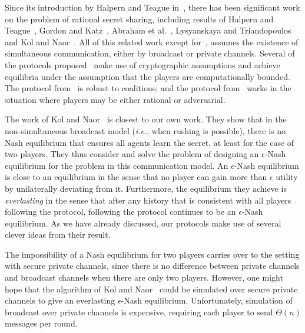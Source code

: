 \documentclass[12pt]{article}
\theoremstyle{definition}
\newcommand{\ie}{\emph{i.e.}}
\begin{document}
Since its introduction by Halpern and Teague
in~\cite{halpern2004rational}, there has been significant work on the
problem of rational secret sharing, including results of Halpern and
Teague~\cite{halpern2004rational}, Gordon and
Katz~\cite{gordon2006rational}, Abraham et
al.~\cite{abraham2006distributed}, Lysyanskaya and
Triandopoulos~\cite{lysyanskaya2006rationality} and Kol and
Naor~\cite{kol2008games}.  All of this related work except
for~\cite{kol2008games}, assumes the existence of simultaneous
communication, either by broadcast or private channels.  Several of
the protocols proposed~\cite{gordon2006rational,
  abraham2006distributed, lysyanskaya2006rationality} make use of
cryptographic assumptions and achieve equilibria under the assumption
that the players are computationally bounded.  The protocol
from~\cite{abraham2006distributed} is robust to coalitions; and the
protocol from~\cite{lysyanskaya2006rationality} works in the situation
where players may be either rational or adversarial.

The work of Kol and Naor~\cite{kol2008games} is closest to our own
work.  They show that in the non-simultaneous broadcast model (\ie,
when rushing is possible), there is no Nash equilibrium that ensures
all agents learn the secret, at least for the case of two
players. They thus consider and solve the problem of designing an
$\epsilon$-Nash equilibrium for the problem in this communication
model.  An $\epsilon$-Nash equilibrium is close to an equilibrium in
the sense that no player can gain more than $\epsilon$ utility by
unilaterally deviating from it. Furthermore, the equilibrium they
achieve is \emph{everlasting} in the sense that after any history that
is consistent with all players following the protocol, following the
protocol continues to be an $\epsilon$-Nash equilibrium.  As we have
already discussed, our protocols make use of several clever ideas from
their result.

The impossibility of a Nash equilibrium for two players carries over
to the setting with secure private channels, since there is no
difference between private channels and broadcast channels when there
are only two players. However, one might hope that the algorithm of
Kol and Naor~\cite{kol2008games} could be simulated over secure
private channels to give an everlasting $\epsilon$-Nash
equilibrium. Unfortunately, simulation of broadcast over private
channels is expensive, requiring each player to send $\Theta(n)$
messages per round.
\end{document}
